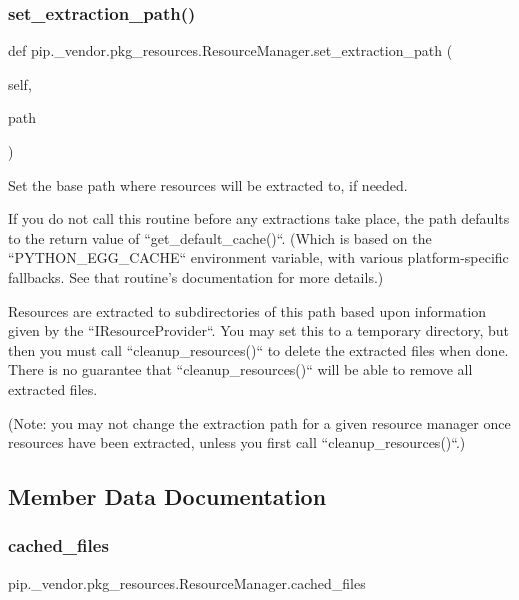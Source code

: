 \subsubsection{\texorpdfstring{set\+\_\+extraction\+\_\+path()}{set\_extraction\_path()}}
{\footnotesize\ttfamily def pip.\+\_\+vendor.\+pkg\+\_\+resources.\+Resource\+Manager.\+set\+\_\+extraction\+\_\+path (\begin{DoxyParamCaption}\item[{}]{self,  }\item[{}]{path }\end{DoxyParamCaption})}

\begin{DoxyVerb}Set the base path where resources will be extracted to, if needed.

If you do not call this routine before any extractions take place, the
path defaults to the return value of ``get_default_cache()``.  (Which
is based on the ``PYTHON_EGG_CACHE`` environment variable, with various
platform-specific fallbacks.  See that routine's documentation for more
details.)

Resources are extracted to subdirectories of this path based upon
information given by the ``IResourceProvider``.  You may set this to a
temporary directory, but then you must call ``cleanup_resources()`` to
delete the extracted files when done.  There is no guarantee that
``cleanup_resources()`` will be able to remove all extracted files.

(Note: you may not change the extraction path for a given resource
manager once resources have been extracted, unless you first call
``cleanup_resources()``.)
\end{DoxyVerb}
 

\subsection{Member Data Documentation}
\mbox{\label{classpip_1_1__vendor_1_1pkg__resources_1_1ResourceManager_aea575c7d408f076473dceda4dfd972be}} 
\subsubsection{\texorpdfstring{cached\+\_\+files}{cached\_files}}
{\footnotesize\ttfamily pip.\+\_\+vendor.\+pkg\+\_\+resources.\+Resource\+Manager.\+cached\+\_\+files}

